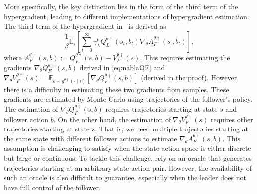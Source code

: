 \documentclass[letterpaper]{article} %
\providecommand{\E}{\mathbb{E}} %
\begin{document}
More specifically, the key distinction lies in the form of the third term of the hypergradient, leading to different implementations of hypergradient estimation.
The third term of the hypergradient in~\citep{Thoma2024-em} is derived as 
\begin{equation}
    \frac{1}{\beta} \E_\tau\left[\sum_{t=0}^\infty \gamma_L^t Q_L^{{\theta} \dagger}(s_t, b_t) \nabla_{\theta} A_F^{{\theta} \dagger}(s_t, b_t)  \right], \label{eq:third_term_thoma_grad}
\end{equation}
where $A_F^{{\theta} \dagger}(s, b) := Q_F^{{\theta} \dagger}(s, b) - V_F^{{\theta} \dagger}(s)$. 
This requires estimating the gradients $\nabla_{\theta} Q_F^{{\theta} \dagger}(s, b)$ derived in \eqref{eq:nablaQF} and $\nabla_{\theta} V_F^{{\theta} \dagger}(s) = \E_{b \sim g^{{\theta}\dagger}(\cdot\mid s)}\left[\nabla_{\theta} Q_F^{{\theta} \dagger}(s, b)\right]$ (derived in the proof). 
However, there is a difficulty in estimating these two gradients from samples. 
These gradients are estimated by Monte Carlo using trajectories of the follower's policy. The estimation of $\nabla_{\theta} Q_F^{{\theta} \dagger}(s, b)$ requires trajectories starting at state $s$ and follower action $b$. On the other hand, the estimation of $\nabla_{\theta} V_F^{{\theta} \dagger}(s)$ requires other trajectories starting at state $s$. 
That is, we need multiple trajectories starting at the same state with different follower actions to estimate $\nabla_{\theta} A_F^{{\theta} \dagger}(s, b)$. 
This assumption is challenging to satisfy when the state-action space is either discrete but large or continuous.
To tackle this challenge, \citet{Thoma2024-em} rely on an oracle that generates trajectories starting at an arbitrary state-action pair.
However, the availability of such an oracle is also difficult to guarantee, especially when the leader does not have full control of the follower. 
\end{document}
